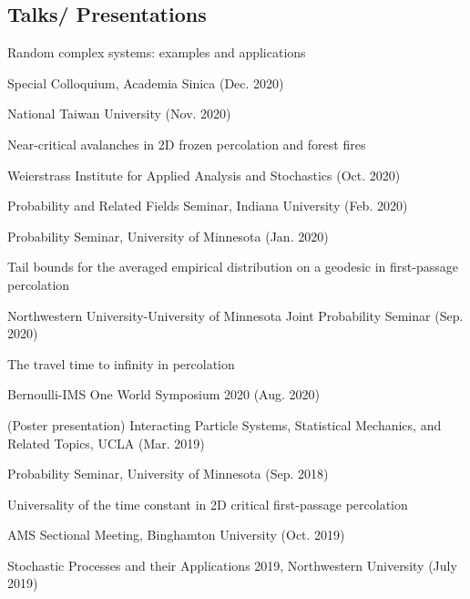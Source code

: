 \documentclass[margin,line,pifont,palatino,courier]{res}
\newenvironment{list1}{
  \begin{list}{\ding{113}}{%
      \setlength{\itemsep}{0in}
      \setlength{\parsep}{0in} \setlength{\parskip}{0in}
      \setlength{\topsep}{0in} \setlength{\partopsep}{0in}
      \setlength{\leftmargin}{0.17in}}}{\end{list}}
\begin{document}
\begin{resume}
\section{\sc Talks/ Presentations}
\begin{list1}
	\item[] Random complex systems: examples and applications
	\begin{list1}
		\vspace*{.05in}
		\item[] Special Colloquium, Academia Sinica (Dec. 2020)
		\item[] National Taiwan University (Nov. 2020)
	\end{list1}
	
	\item[] Near-critical avalanches in 2D frozen percolation and forest fires
	\begin{list1}
		\vspace*{.05in}
		\item[] Weierstrass Institute for Applied Analysis and Stochastics (Oct. 2020)
		\item[] Probability and Related Fields Seminar, Indiana University (Feb. 2020)
		\item[] Probability Seminar, University of Minnesota (Jan. 2020)
	\end{list1}
	
	\item[] Tail bounds for the averaged empirical distribution on a geodesic in first-passage percolation
	\begin{list1}
		\vspace*{.05in}
		\item[] Northwestern University-University of Minnesota Joint Probability Seminar (Sep. 2020)
	\end{list1}
	
	\item[] The travel time to infinity in percolation
	\begin{list1}
		\vspace*{.05in}
		\item[] Bernoulli-IMS One World Symposium 2020 (Aug. 2020)
		\item[] (Poster presentation) Interacting Particle Systems, Statistical Mechanics, and Related Topics, UCLA (Mar. 2019)
		\item[] Probability Seminar, University of Minnesota (Sep. 2018)
	\end{list1}

	\item[] Universality of the time constant in 2D critical first-passage percolation
	\begin{list1}
		\vspace*{.05in}
		\item[] AMS Sectional Meeting, Binghamton University (Oct. 2019)
		\item[] Stochastic Processes and their Applications 2019, Northwestern University (July 2019)
	\end{list1}


\end{list1}
\end{resume}
\end{document}
